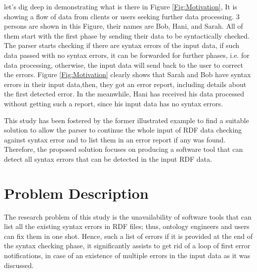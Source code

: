 let's dig deep in demonstrating what is there in  {Figure \ref{Fig:Motivation}}, It is showing a flow of data from clients or users seeking further data processing. 3 persons are shown in this Figure, their names are Bob, Hani, and Sarah. All of them start with the first phase by sending their data to be syntactically checked. The parser starts checking if there are syntax errors of the input data, if such data passed with no syntax errors, it can be forwarded for further phases, i.e. for data processing, otherwise, the input data will send back to the user to correct the errors. {Figure \ref{Fig:Motivation}} clearly shows that Sarah and Bob have syntax errors in their input data,then, they got an error report, including details about the first detected error. In the meanwhile, Hani has received his data processed without getting such a report, since his input data has no syntax errors. 

This study has been fostered by the former illustrated example to find a suitable solution to allow the parser to continue the whole input of RDF data checking against syntax error and to list them in an error report if any was found. Therefore, the proposed solution focuses on producing a software tool that can detect all syntax errors that can be detected in the input RDF data. 

\section{Problem Description } 	
The research problem of this study is the unavailability of software tools that can list all the existing syntax errors in RDF files; thus, ontology engineers and users can fix them in one shot. Hence, such a list of errors if it is provided at the end of the syntax checking phase, it significantly assists to get rid of a loop of first error notifications, in case of an existence of multiple errors  in the input data as it was discussed.  

